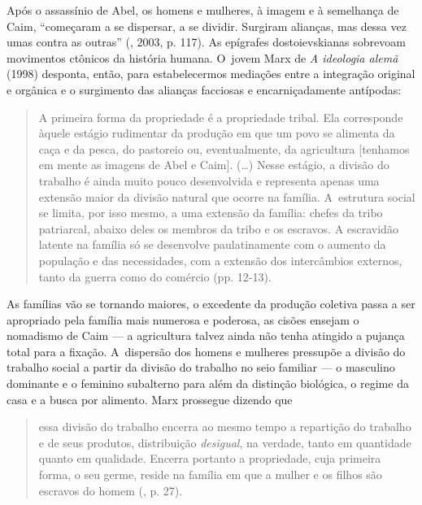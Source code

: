 Após o assassínio de Abel, os homens e mulheres, à imagem e à semelhança
de Caim, ``começaram a se dispersar, a se dividir. Surgiram alianças,
mas dessa vez umas contra as outras'' (, 2003, p. 117). As
epígrafes dostoievskianas sobrevoam movimentos ctônicos da história
humana. O~jovem Marx de \emph{A ideologia alemã} (1998) desponta, então,
para estabelecermos mediações entre a integração original e orgânica e o
surgimento das alianças facciosas e encarniçadamente antípodas:

\begin{quote}
A primeira forma da propriedade é a propriedade tribal. Ela corresponde
àquele estágio rudimentar da produção em que um povo se alimenta da caça
e da pesca, do pastoreio ou, eventualmente, da agricultura {[}tenhamos
em mente as imagens de Abel e Caim{]}. (\ldots) Nesse estágio, a divisão do
trabalho é ainda muito pouco desenvolvida e representa apenas uma
extensão maior da divisão natural que ocorre na família. A~estrutura
social se limita, por isso mesmo, a uma extensão da família: chefes da
tribo patriarcal, abaixo deles os membros da tribo e os escravos. A
escravidão latente na família só se desenvolve paulatinamente com o
aumento da população e das necessidades, com a extensão dos intercâmbios
externos, tanto da guerra como do comércio (pp. 12-13).
\end{quote}

As famílias vão se tornando maiores, o excedente da produção coletiva
passa a ser apropriado pela família mais numerosa e poderosa, as cisões
ensejam o nomadismo de Caim --- a agricultura talvez ainda não tenha
atingido a pujança total para a fixação. A~dispersão dos homens e
mulheres pressupõe a divisão do trabalho social a partir da divisão do
trabalho no seio familiar --- o masculino dominante e o feminino
subalterno para além da distinção biológica, o regime da casa e a busca
por alimento. Marx prossegue dizendo que

\begin{quote}
essa divisão do trabalho encerra ao mesmo tempo a repartição do trabalho
e de seus produtos, distribuição \emph{desigual}, na verdade, tanto em
quantidade quanto em qualidade. Encerra portanto a propriedade, cuja
primeira forma, o seu germe, reside na família em que a mulher e os
filhos são escravos do homem (, p. 27).
\end{quote}

